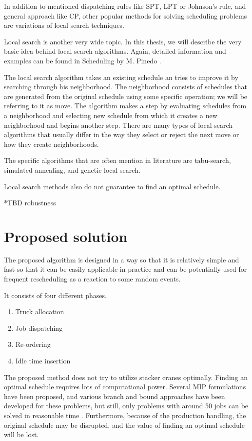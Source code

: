 \documentclass{ctuthesis}
\begin{document}
In addition to mentioned dispatching rules like SPT, LPT or Johnson's rule, and general approach like CP, other popular methods for solving scheduling problems are variations of local search techniques.

Local search is another very wide topic. In this thesis, we will describe the very basic idea behind local search algorithms. Again, detailed information and examples can be found in Scheduling by M. Pinedo \cite{pinedo}. 

The local search algorithm takes an existing schedule an tries to improve it by searching through his neighborhood. The neighborhood consists of schedules that are generated from the original schedule using some specific operation; we will be referring to it as move. The algorithm makes a step by evaluating schedules from a neighborhood and selecting new schedule from which it creates a new neighborhood and begins another step. There are many types of local search algorithms that usually differ in the way they select or reject the next move or how they create neighborhoods. 

The specific algorithms that are often mention in literature are tabu-search, simulated annealing, and genetic local search.

Local search methods also do not guarantee to find an optimal schedule.

*TBD robustness

\chapter{Proposed solution}
\label{ch:Proposed solution}

The proposed algorithm is designed in a way so that it is relatively simple and fast so that it can be easily applicable in practice and can be potentially used for frequent rescheduling as a reaction to some random events.

It consists of four different phases.

\begin{enumerate}
    \item Truck allocation
    \item Job dispatching
    \item Re-ordering
    \item Idle time insertion
\end{enumerate}

The proposed method does not try to utilize stacker cranes optimally. Finding an optimal schedule requires lots of computational power. Several MIP formulations have been proposed, and various branch and bound approaches have been developed for these problems, but still, only problems with around 50 jobs can be solved in reasonable time \cite{pinedo}. Furthermore, because of the production handling, the original schedule may be disrupted, and the value of finding an optimal schedule will be lost. 
\end{document}
